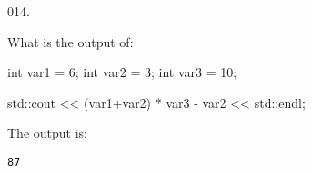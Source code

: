 \documentclass[]{book}
\newenvironment{Shaded}{}{}
\newcommand{\BuiltInTok}[1]{#1}
\newcommand{\DataTypeTok}[1]{\textcolor[rgb]{0.56,0.13,0.00}{#1}}
\newcommand{\DecValTok}[1]{\textcolor[rgb]{0.25,0.63,0.44}{#1}}
\newcommand{\NormalTok}[1]{#1}
\begin{document}
\begin{minipage}{\linewidth}\noindent
{\tiny 014.}\\
\begin{minipage}[t]{.485\linewidth}

What is the output of:

\begin{framed}

\begin{Shaded}
\begin{Highlighting}[]
\DataTypeTok{int}\NormalTok{ var1 = }\DecValTok{6}\NormalTok{;}
\DataTypeTok{int}\NormalTok{ var2 = }\DecValTok{3}\NormalTok{;}
\DataTypeTok{int}\NormalTok{ var3 = }\DecValTok{10}\NormalTok{;}

\BuiltInTok{std::}\NormalTok{cout}
\NormalTok{  << (var1+var2) * var3 - var}\DecValTok{2}
\NormalTok{  << }\BuiltInTok{std::}\NormalTok{endl;}
\end{Highlighting}
\end{Shaded}

\end{framed}

\end{minipage}
\hfill
\begin{minipage}[t]{.485\linewidth}

The output is:

\begin{framed}

\begin{verbatim}
87
\end{verbatim}

\end{framed}

\end{minipage}
\end{minipage}

\vspace{2mm}\noindent\hrulefill{}
\end{document}
